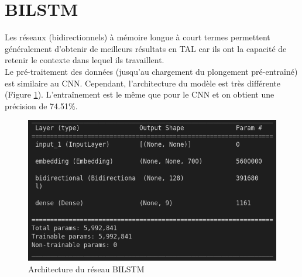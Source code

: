 \section{BILSTM}
Les réseaux (bidirectionnels) à mémoire longue à court termes permettent généralement d'obtenir de meilleurs résultats en TAL car ils ont la capacité de retenir le contexte dans lequel ils travaillent.\\
Le pré-traitement des données (jusqu'au chargement du plongement pré-entraîné) est similaire au CNN. Cependant, l'architecture du modèle est très différente (Figure \ref{architecture_bilstm}). L'entraînement est le même que pour le CNN et on obtient une précision de 74.51\%.

\begin{figure}
    \center
    \includegraphics[scale=.3]{img/architecture_bilstm.png}
    \caption{Architecture du réseau BILSTM}
    \label{architecture_bilstm}
\end{figure}